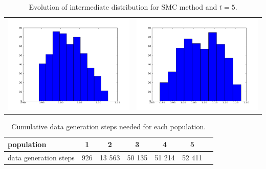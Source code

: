 \documentclass[12pt,a4paper,titlepage]{article}
\begin{document}
\begin{table}[ht]
\begin{tabular}{cc}
\includegraphics[scale=0.2]{p5th1_4}&\includegraphics[scale=0.2]{p5th2_4.png}\\
\end{tabular}
\caption{Evolution of intermediate distribution for SMC method and $t=5$.}
\label{fig:smcinter}
\end{table}
\begin{table}[ht]
\centering
\begin{tabular}{ l*{5} c r }
\hline
population              & 1 & 2 & 3 & 4 & 5 \\
\hline
data generation steps & 926 & 13 563 & 50 135 & 51 214 & 52 411   \\
\hline
\end{tabular}
\caption{Cumulative data generation steps needed for each population.}
\label{tab:dsteps}
\end{table}
\end{document}
